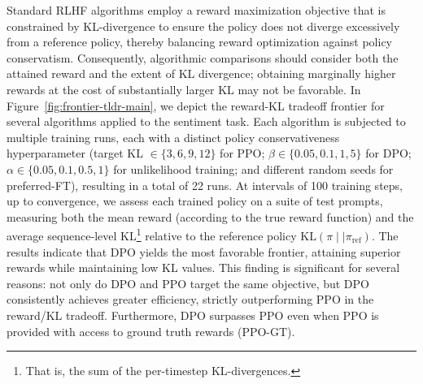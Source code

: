 Standard RLHF algorithms employ a reward maximization objective that is constrained by KL-divergence to ensure the policy does not diverge excessively from a reference policy, thereby balancing reward optimization against policy conservatism. Consequently, algorithmic comparisons should consider both the attained reward and the extent of KL divergence; obtaining marginally higher rewards at the cost of substantially larger KL may not be favorable. In Figure~\ref{fig:frontier-tldr-main}, we depict the reward-KL tradeoff frontier for several algorithms applied to the sentiment task. Each algorithm is subjected to multiple training runs, each with a distinct policy conservativeness hyperparameter (target KL $\in\{3,6,9,12\}$ for PPO; $\beta \in \{0.05,0.1,1,5\}$ for DPO; $\alpha\in\{0.05,0.1,0.5,1\}$ for unlikelihood training; and different random seeds for preferred-FT), resulting in a total of 22 runs. At intervals of 100 training steps, up to convergence, we assess each trained policy on a suite of test prompts, measuring both the mean reward (according to the true reward function) and the average sequence-level KL\footnote{That is, the sum of the per-timestep KL-divergences.} relative to the reference policy $\text{KL}\left(\pi\mid \mid \pi_\text{ref}\right)$. The results indicate that DPO yields the most favorable frontier, attaining superior rewards while maintaining low KL values. This finding is significant for several reasons: not only do DPO and PPO target the same objective, but DPO consistently achieves greater efficiency, strictly outperforming PPO in the reward/KL tradeoff. Furthermore, DPO surpasses PPO even when PPO is provided with access to ground truth rewards (PPO-GT).

